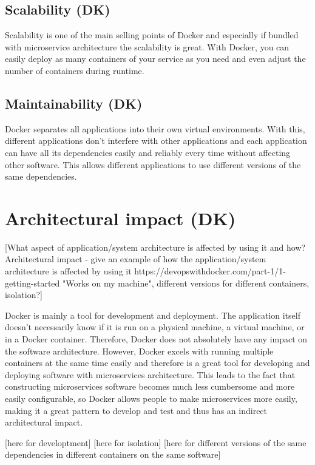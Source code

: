 \documentclass[fleqn,12pt]{olplainarticle}
\begin{document}
\subsection{Scalability (DK)}
Scalability is one of the main selling points of Docker and especially if bundled with microservice architecture the scalability is great. With Docker, you can easily deploy as many containers of your service as you need and even adjust the number of containers during runtime.

\subsection{Maintainability (DK)}
Docker separates all applications into their own virtual environments. With this, different applications don't interfere with other applications and each application can have all its dependencies easily and reliably every time without affecting other software. This allows different applications to use different versions of the same dependencies.

\section{Architectural impact (DK)}

[What aspect of application/system architecture is affected by using it and how?
Architectural impact - give an example of how the application/system architecture is affected by using it
https://devopswithdocker.com/part-1/1-getting-started
"Works on my machine", different versions for different containers, isolation?]

Docker is mainly a tool for development and deployment. The application itself doesn't necessarily know if it is run on a physical machine, a virtual machine, or in a Docker container. Therefore, Docker does not absolutely have any impact on the software architecture. However, Docker excels with running multiple containers at the same time easily and therefore is a great tool for developing and deploying software with microservices architecture. This leads to the fact
that constructing microservices software becomes much less cumbersome and more easily configurable, so Docker allows people to make microservices more easily, making it a great pattern to develop and test and thus has an indirect architectural impact.

[here for developtment]
[here for isolation]
[here for different versions of the same dependencies in different containers on the same software]
\end{document}

